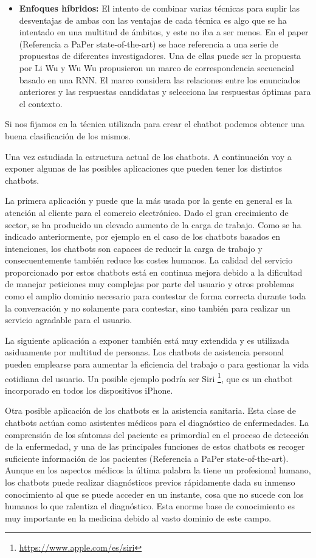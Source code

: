\begin{itemize}
\item \textbf{Enfoques híbridos:} El intento de combinar varias técnicas para suplir las desventajas de ambas con las ventajas de cada técnica es algo que se ha intentado en una multitud de ámbitos, y este no iba a ser menos. En el paper (Referencia a PaPer state-of-the-art) se hace referencia a una serie de propuestas de diferentes investigadores. Una de ellas puede ser la propuesta por Li Wu y Wu Wu propusieron un marco de correspondencia secuencial basado en una RNN. El marco considera las relaciones entre los enunciados anteriores y las respuestas candidatas y selecciona las respuestas óptimas para el contexto.
\end{itemize}

Si nos fijamos en la técnica utilizada para crear el chatbot podemos obtener una buena clasificación de los mismos.

Una vez estudiada la estructura actual de los chatbots. A continuación voy a exponer algunas de las posibles aplicaciones que pueden tener los distintos chatbots.

La primera aplicación y puede que la más usada por la gente en general es la atención al cliente para el comercio electrónico. Dado el gran crecimiento de sector, se ha producido un elevado aumento de la carga de trabajo. Como se ha indicado anteriormente, por ejemplo en el caso de los chatbots basados en intenciones, los chatbots son capaces de reducir la carga de trabajo y consecuentemente también reduce los costes humanos. La calidad del servicio proporcionado por estos chatbots está en continua mejora debido a la dificultad de manejar peticiones muy complejas por parte del usuario y otros problemas como el amplio dominio necesario para contestar de forma correcta durante toda la conversación y no solamente para contestar, sino también para realizar un servicio agradable para el usuario.

La siguiente aplicación a exponer también está muy extendida y es utilizada asiduamente por multitud de personas. Los chatbots de asistencia personal pueden emplearse para aumentar la eficiencia del trabajo o para gestionar la vida cotidiana del usuario. Un posible ejemplo podría ser Siri \footnote{\url{https://www.apple.com/es/siri}}, que es un chatbot incorporado en todos los dispositivos iPhone.

Otra posible aplicación de los chatbots es la asistencia sanitaria. Esta clase de chatbots actúan como asistentes médicos para el diagnóstico de enfermedades. La comprensión de los síntomas del paciente es primordial en el proceso de detección de la enfermedad, y una de las principales funciones de estos chatbots es recoger suficiente información de los pacientes (Referencia a PaPer state-of-the-art). Aunque en los aspectos médicos la última palabra la tiene un profesional humano, los chatbots puede realizar diagnósticos previos rápidamente dada su inmenso conocimiento al que se puede acceder en un instante, cosa que no sucede con los humanos lo que ralentiza el diagnóstico. Esta enorme base de conocimiento es muy importante en la medicina debido al vasto dominio de este campo.

